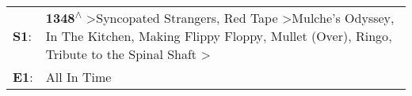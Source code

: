 \begin{supertabular}{p{0.03\textwidth}p{0.92\textwidth}}
 \textbf{S1}:  &  \textbf{1348\textsuperscript{$\wedge$}} \textgreater \enspace Syncopated Strangers\textsuperscript{}, \enspace Red Tape\textsuperscript{} \textgreater \enspace Mulche's Odyssey\textsuperscript{}, \enspace In The Kitchen\textsuperscript{}, \enspace Making Flippy Floppy\textsuperscript{}, \enspace Mullet (Over)\textsuperscript{}, \enspace Ringo\textsuperscript{}, \enspace Tribute to the Spinal Shaft\textsuperscript{} \textgreater {}\textsuperscript{}  \enspace  \\
 \textbf{E1}:  &                                                                                                                                                                                                                                                                                                                                                                                                                                                    All In Time\textsuperscript{}  \enspace  \\
\end{supertabular}
